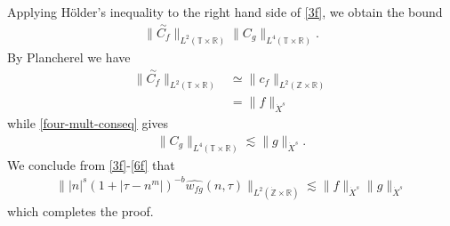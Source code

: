 \documentclass[12pt,reqno]{amsart}
\numberwithin{equation}{section}  %
\numberwithin{figure}{section}
\newcommand{\rr}{\mathbb{R}}
\newcommand{\zz}{\mathbb{Z}}
\newcommand{\ci}{\mathbb{T}}
\newcommand{\zzdot}{\dot{\zz}}
\newcommand{\wh}{\widehat}
\theoremstyle{plain}
\theoremstyle{definition}
\theoremstyle{remark}
\begin{document}
%
Applying H\"{o}lder's inequality to the right hand side of
\eqref{3f}, we obtain the bound
%
\begin{equation}
	\label{4f}
	\begin{split}
		\|\overset{\sim}{C_f} \|_{L^2(\ci \times \rr)} \|C_g \|_{L^4\left( \ci 
		\times \rr 
		\right)}. 
	\end{split}
\end{equation}
%
By Plancherel we have
%
%
\begin{equation}
	\label{5f}
	\begin{split}
		\|\overset{\sim}{C_f} \|_{L^2(\ci \times \rr)}
		& \simeq \|c_f\|_{L^2(\zz \times \rr)}
		\\
		& = \|f \|_{\dot{X}^s}
	\end{split}
\end{equation}
%
while \eqref{four-mult-conseq} gives
%
%
\begin{equation}
	\label{6f}
	\begin{split}
		\|C_g \|_{L^4(\ci \times \rr)} \lesssim \|g\|_{\dot{X}^s}.
	\end{split}
\end{equation}
%
%
We conclude from \eqref{3f}-\eqref{6f} that
%
%
\begin{equation*}
	\begin{split}
		\| |n|^s \left( 1 + | \tau - n^{m } | \right)^{-b} \wh{w_{fg}}(n, \tau) 
		 \|_{L^2(\zzdot \times \rr)}
		 \lesssim \|f\|_{\dot{X}^s} \|g\|_{\dot{X}^s}
	\end{split}
\end{equation*}
%
%
which completes the proof.  \qquad \qedsymbol
%
%
\end{document}
